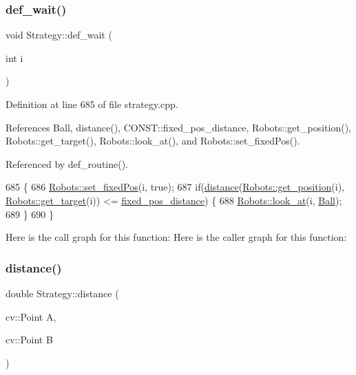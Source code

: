 \subsubsection{\texorpdfstring{def\+\_\+wait()}{def\_wait()}}
{\footnotesize\ttfamily void Strategy\+::def\+\_\+wait (\begin{DoxyParamCaption}\item[{int}]{i }\end{DoxyParamCaption})}



Definition at line 685 of file strategy.\+cpp.



References Ball, distance(), C\+O\+N\+S\+T\+::fixed\+\_\+pos\+\_\+distance, Robots\+::get\+\_\+position(), Robots\+::get\+\_\+target(), Robots\+::look\+\_\+at(), and Robots\+::set\+\_\+fixed\+Pos().



Referenced by def\+\_\+routine().


\begin{DoxyCode}
685                              \{
686     \hyperlink{class_robots_a427266e3332ab91bb3a78b5fb61a6c2c}{Robots::set\_fixedPos}(i, \textcolor{keyword}{true});
687     \textcolor{keywordflow}{if}(\hyperlink{class_strategy_aacce05caed71553c4efd2d28c9c3aa39}{distance}(\hyperlink{class_robots_a1fca8f2f5070176faa6ba1efa2f1ff14}{Robots::get\_position}(i), 
      \hyperlink{class_robots_a8a4fe339df4823e45cf34d9fb8daa64b}{Robots::get\_target}(i)) <= \hyperlink{namespace_c_o_n_s_t_ae8d764cbcf03a0351752bff7d9cb30e6}{fixed\_pos\_distance}) \{
688         \hyperlink{class_robots_a3b307142c41d7adc7614e6e4f2caf16b}{Robots::look\_at}(i, \hyperlink{class_strategy_abd16b6276e747f6cd99a19963ff5495b}{Ball});
689     \}
690 \}
\end{DoxyCode}
Here is the call graph for this function\+:
Here is the caller graph for this function\+:
\mbox{\label{class_strategy_aacce05caed71553c4efd2d28c9c3aa39}} 
\subsubsection{\texorpdfstring{distance()}{distance()}}
{\footnotesize\ttfamily double Strategy\+::distance (\begin{DoxyParamCaption}\item[{cv\+::\+Point}]{A,  }\item[{cv\+::\+Point}]{B }\end{DoxyParamCaption})\hspace{0.3cm}{\ttfamily [private]}}



